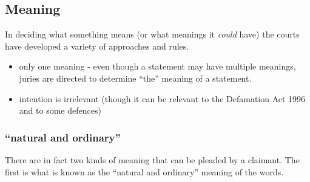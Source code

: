 \documentclass[]{article}
\begin{document}
\subsection{Meaning}

{In deciding what something means (or what meanings it }\emph{{could
}}{{have) the courts have developed a variety of approaches and rules.}}

\begin{itemize}
\item
  only one meaning - even though a statement may have multiple meanings,
  juries are directed to determine ``the'' meaning of a statement.
\item
  intention is irrelevant (though it can be relevant to the Defamation
  Act 1996 and to some defences)
\end{itemize}

\subsubsection{\texorpdfstring{``natural and
ordinary''}{natural and ordinary}}

There are in fact two kinds of meaning that can be pleaded by a
claimant. The first is what is known as the ``natural and ordinary''
meaning of the words.
\end{document}
